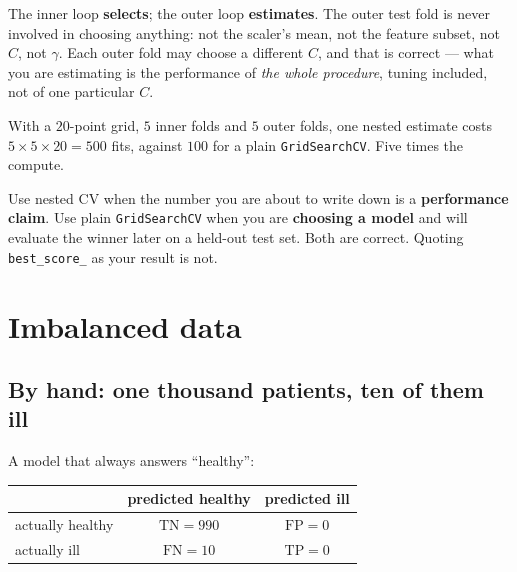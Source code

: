 \documentclass[11pt]{article}
\begin{document}
The inner loop \textbf{selects}; the outer loop \textbf{estimates}. The outer
test fold is never involved in choosing anything: not the scaler's mean, not
the feature subset, not $C$, not $\gamma$. Each outer fold may choose a
different $C$, and that is correct --- what you are estimating is the
performance of \emph{the whole procedure}, tuning included, not of one
particular $C$.

\begin{worked}
With a $20$-point grid, $5$ inner folds and $5$ outer folds, one nested
estimate costs $5 \times 5 \times 20 = 500$ fits, against $100$ for a plain
\texttt{GridSearchCV}. Five times the compute.

Use nested CV when the number you are about to write down is a
\textbf{performance claim}. Use plain \texttt{GridSearchCV} when you are
\textbf{choosing a model} and will evaluate the winner later on a held-out
test set. Both are correct. Quoting \texttt{best\_score\_} as your result is
not.
\end{worked}

\section{Imbalanced data}
\label{sec:imbal}

\subsection{By hand: one thousand patients, ten of them ill}

A model that always answers ``healthy'':

\begin{center}\small
\begin{tabular}{@{}lcc@{}}
  \toprule
  & predicted healthy & predicted ill\\
  \midrule
  actually healthy & $\mathrm{TN} = 990$ & $\mathrm{FP} = 0$\\
  actually ill     & $\mathrm{FN} = 10$  & $\mathrm{TP} = 0$\\
  \bottomrule
\end{tabular}
\end{center}
\end{document}
